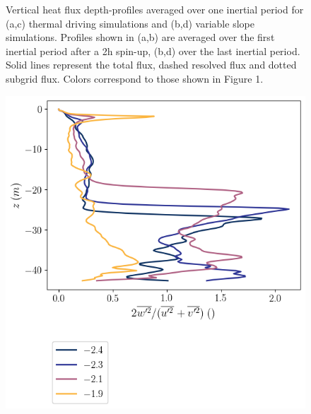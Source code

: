 \documentclass[draft,jgrga]{agutexSI2019}
\begin{document}
\begin{figure}[]
\begin{minipage}{0.5\textwidth}
    \end{minipage}
    \caption{Vertical heat flux depth-profiles averaged over one inertial period for (a,c) thermal driving simulations and (b,d) variable slope simulations. Profiles shown in (a,b) are averaged over the first inertial period after a 2h spin-up, (b,d) over the last inertial period. Solid lines represent the total flux, dashed resolved flux and dotted subgrid flux. Colors correspond to those shown in Figure 1.}
    \label{fig:res_sgs_flux}
\end{figure}

\begin{figure}[]
    \centering
    \begin{minipage}{0.5\textwidth}
        \includegraphics[trim={0 4cm 0 0},clip,width=\textwidth]{Figures/vel_var_ratio_cmp_dT_40hr_tav1_z_profile.png}
    \end{minipage}%
    \begin{minipage}{0.5\textwidth}

\end{minipage}
\end{figure}
\end{document}
